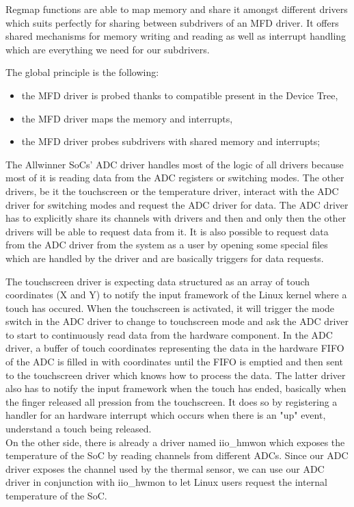 Regmap functions are able to map memory and share it amongst different drivers which suits perfectly for sharing between subdrivers of an MFD driver. It offers shared mechanisms for memory writing and reading as well as interrupt handling which are everything we need for our subdrivers.

The global principle is the following:

\begin{itemize}
  \item the MFD driver is probed thanks to compatible present in the Device Tree,
  \item the MFD driver maps the memory and interrupts,
  \item the MFD driver probes subdrivers with shared memory and interrupts;
\end{itemize}

The Allwinner SoCs' ADC driver handles most of the logic of all drivers because most of it is reading data from the ADC registers or switching modes. The other drivers, be it the touchscreen or the temperature driver, interact with the ADC driver for switching modes and request the ADC driver for data. The ADC driver has to explicitly share its channels with drivers and then and only then the other drivers will be able to request data from it. It is also possible to request data from the ADC driver from the system as a user by opening some special files which are handled by the driver and are basically triggers for data requests.

The touchscreen driver is expecting data structured as an array of touch coordinates (X and Y) to notify the input framework of the Linux kernel where a touch has occured. When the touchscreen is activated, it will trigger the mode switch in the ADC driver to change to touchscreen mode and ask the ADC driver to start to continuously read data from the hardware component. In the ADC driver, a buffer of touch coordinates representing the data in the hardware FIFO of the ADC is filled in with coordinates until the FIFO is emptied and then sent to the touchscreen driver which knows how to process the data. The latter driver also has to notify the input framework when the touch has ended, basically when the finger released all pression from the touchscreen. It does so by registering a handler for an hardware interrupt which occurs when there is an "up" event, understand a touch being released.\\
On the other side, there is already a driver named iio\_hmwon which exposes the temperature of the SoC by reading channels from different ADCs. Since our ADC driver exposes the channel used by the thermal sensor, we can use our ADC driver in conjunction with iio\_hwmon to let Linux users request the internal temperature of the SoC.

